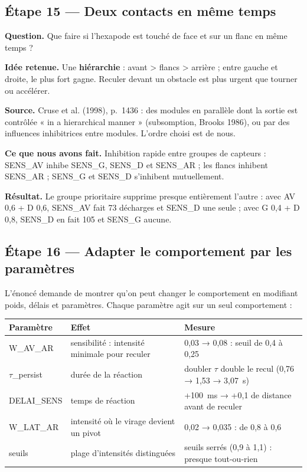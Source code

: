 \documentclass[11pt]{article}
\newcommand{\champ}[2]{\par\noindent\textbf{\color{bleu}#1} #2\par}
\begin{document}
\subsection*{Étape 15 --- Deux contacts en même temps}

\champ{Question.}{Que faire si l'hexapode est touché de face et sur un flanc en même temps ?}
\champ{Idée retenue.}{Une \textbf{hiérarchie} : avant > flancs > arrière ; entre gauche et droite,
le plus fort gagne. Reculer devant un obstacle est plus urgent que tourner ou accélérer.}
\champ{Source.}{Cruse et al. (1998), p.~1436 \cite{cruse1998} : des modules en parallèle dont la
sortie est contrôlée « in a hierarchical manner » (subsomption, Brooks 1986), ou par des
influences inhibitrices entre modules. L'ordre choisi est de nous.}
\champ{Ce que nous avons fait.}{Inhibition rapide entre groupes de capteurs : SENS\_AV inhibe
SENS\_G, SENS\_D et SENS\_AR ; les flancs inhibent SENS\_AR ; SENS\_G et SENS\_D s'inhibent
mutuellement.}
\champ{Résultat.}{Le groupe prioritaire supprime presque entièrement l'autre : avec AV 0,6 + D 0,6,
SENS\_AV fait 73 décharges et SENS\_D une seule ; avec G 0,4 + D 0,8, SENS\_D en fait 105 et
SENS\_G aucune.}

\subsection*{Étape 16 --- Adapter le comportement par les paramètres}

L'énoncé demande de montrer qu'on peut changer le comportement en modifiant poids, délais et
paramètres. Chaque paramètre agit sur un seul comportement :

\begin{center}
\small
\begin{tabularx}{\linewidth}{>{\ttfamily}l X X}
  \toprule
  \textrm{\textbf{Paramètre}} & \textbf{Effet} & \textbf{Mesure}\\ \midrule
  W\_AV\_AR & sensibilité : intensité minimale pour reculer & 0,03 → 0,08 : seuil de 0,4 à 0,25\\
  $\tau$\_persist & durée de la réaction & doubler $\tau$ double le recul (0,76 → 1,53 → 3,07~s)\\
  DELAI\_SENS & temps de réaction & +100~ms → +0,1 de distance avant de reculer\\
  W\_LAT\_AR & intensité où le virage devient un pivot & 0,02 → 0,035 : de 0,8 à 0,6\\
  seuils & plage d'intensités distinguées & seuils serrés (0,9 à 1,1) : presque tout-ou-rien\\ \bottomrule
\end{tabularx}
\end{center}
\end{document}
